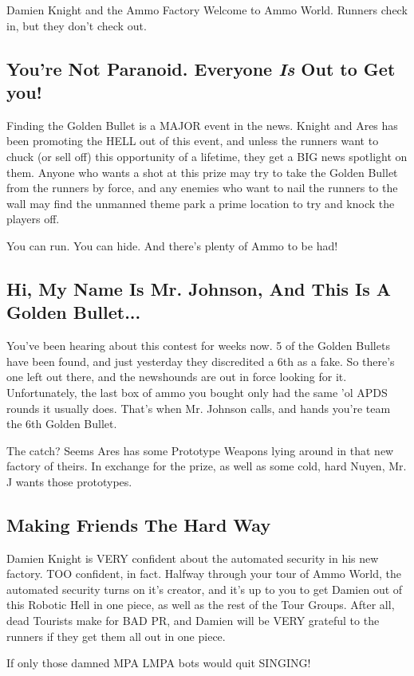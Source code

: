 \begin{scenario}{Damien Knight and the Ammo Factory}
Welcome to Ammo World. Runners check in, but they don't check out.

\subsection{You're Not Paranoid. Everyone \textit{Is} Out to Get you!}

Finding the Golden Bullet is a MAJOR event in the news. Knight and Ares has been promoting the HELL out of this event, and unless the runners want to chuck (or sell off) this opportunity of a lifetime, they get a BIG news spotlight on them. Anyone who wants a shot at this prize may try to take the Golden Bullet from the runners by force, and any enemies who want to nail the runners to the wall may find the unmanned theme park a prime location to try and knock the players off.

You can run. You can hide. And there's plenty of Ammo to be had!

\subsection{Hi, My Name Is Mr. Johnson, And This Is A Golden Bullet...}

You've been hearing about this contest for weeks now. 5 of the Golden Bullets have been found, and just yesterday they discredited a 6th as a fake. So there's one left out there, and the newshounds are out in force looking for it. Unfortunately, the last box of ammo you bought only had the same 'ol APDS rounds it usually does. That's when Mr. Johnson calls, and hands you're team the 6th Golden Bullet.

The catch? Seems Ares has some Prototype Weapons lying around in that new factory of theirs. In exchange for the prize, as well as some cold, hard Nuyen, Mr. J wants those prototypes.

\subsection{Making Friends The Hard Way}

Damien Knight is VERY confident about the automated security in his new factory. TOO confident, in fact. Halfway through your tour of Ammo World, the automated security turns on it's creator, and it's up to you to get Damien out of this Robotic Hell in one piece, as well as the rest of the Tour Groups. After all, dead Tourists make for BAD PR, and Damien will be VERY grateful to the runners if they get them all out in one piece.

If only those damned MPA LMPA bots would quit SINGING!

\end{scenario}